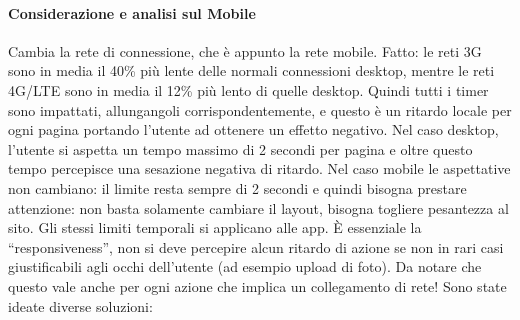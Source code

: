 \paragraph*{Considerazione e analisi sul Mobile }Cambia la rete di connessione, che \`e appunto la rete mobile. Fatto: le reti 3G sono in media il 40\% pi\`u lente delle normali connessioni desktop, mentre le reti 4G/LTE sono in media il 12\% pi\`u lento di quelle desktop. Quindi tutti i timer sono impattati, allungangoli corrispondentemente, e questo \`e un ritardo locale per ogni pagina portando l'utente ad ottenere un effetto negativo. Nel caso desktop, l'utente si aspetta un tempo massimo di 2 secondi per pagina e oltre questo tempo percepisce una sesazione negativa di ritardo. Nel caso mobile le aspettative non cambiano: il limite resta sempre di 2 secondi e quindi bisogna prestare attenzione: non basta solamente cambiare il layout, bisogna togliere pesantezza al sito. Gli stessi limiti temporali si applicano alle app. \`E essenziale la ``responsiveness'', non si deve percepire alcun ritardo di azione se non in rari casi giustificabili agli occhi dell'utente (ad esempio upload di foto). Da notare che questo vale anche per ogni azione che implica un collegamento di rete! Sono state ideate diverse soluzioni:
